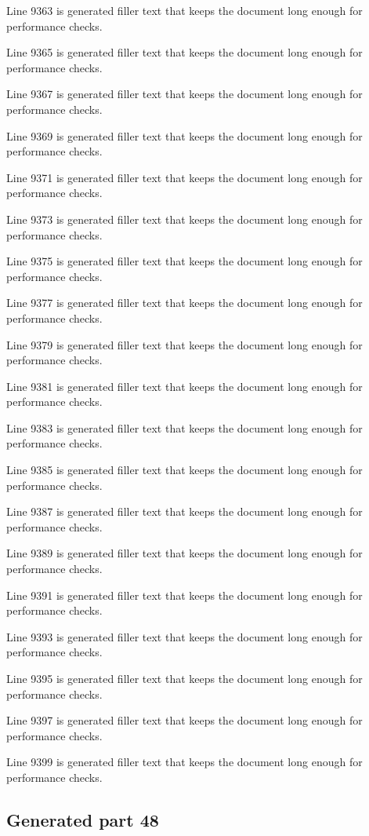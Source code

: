 Line 9363 is generated filler text that keeps the document long enough for performance checks.

Line 9365 is generated filler text that keeps the document long enough for performance checks.

Line 9367 is generated filler text that keeps the document long enough for performance checks.

Line 9369 is generated filler text that keeps the document long enough for performance checks.

Line 9371 is generated filler text that keeps the document long enough for performance checks.

Line 9373 is generated filler text that keeps the document long enough for performance checks.

Line 9375 is generated filler text that keeps the document long enough for performance checks.

Line 9377 is generated filler text that keeps the document long enough for performance checks.

Line 9379 is generated filler text that keeps the document long enough for performance checks.

Line 9381 is generated filler text that keeps the document long enough for performance checks.

Line 9383 is generated filler text that keeps the document long enough for performance checks.

Line 9385 is generated filler text that keeps the document long enough for performance checks.

Line 9387 is generated filler text that keeps the document long enough for performance checks.

Line 9389 is generated filler text that keeps the document long enough for performance checks.

Line 9391 is generated filler text that keeps the document long enough for performance checks.

Line 9393 is generated filler text that keeps the document long enough for performance checks.

Line 9395 is generated filler text that keeps the document long enough for performance checks.

Line 9397 is generated filler text that keeps the document long enough for performance checks.

Line 9399 is generated filler text that keeps the document long enough for performance checks.

\subsection{Generated part 48}

